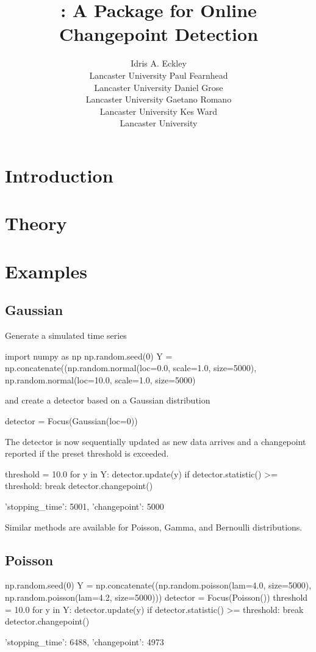 \documentclass[article]{jss}
\author{Idris A. Eckley\\Lancaster University
  \And Paul Fearnhead\\Lancaster University
  \And Daniel Grose\\Lancaster University
  \AND Gaetano Romano\\Lancaster University
  \And Kes Ward\\Lancaster University}
\title{\pkg{changepoint\_online} : A \proglang{Python} Package for Online Changepoint Detection }
\begin{document}
\section{Introduction} \label{section:introduction}



\section{Theory} \label{section:theory}



\section{Examples} \label{section:examples}
%
%
\subsection{Gaussian}
Generate a simulated time series
%
\begin{CodeChunk}
\begin{CodeInput}
import numpy as np
np.random.seed(0)
Y = np.concatenate((np.random.normal(loc=0.0, scale=1.0, size=5000),
                    np.random.normal(loc=10.0, scale=1.0, size=5000)
\end{CodeInput}
\end{CodeChunk}
%
and create a detector based on a Gaussian distribution
%
\begin{CodeChunk}
\begin{CodeInput}
detector = Focus(Gaussian(loc=0))                
\end{CodeInput}
\end{CodeChunk}
%
The detector is now sequentially updated as new data arrives and a changepoint reported if the preset threshold is exceeded.
%
\begin{CodeChunk}
\begin{CodeInput}
threshold = 10.0
for y in Y:
    detector.update(y)
    if detector.statistic() >= threshold:
        break
detector.changepoint()
\end{CodeInput}
\begin{CodeOutput}
{'stopping_time': 5001, 'changepoint': 5000}
\end{CodeOutput}
\end{CodeChunk}
%

Similar methods are available for Poisson, Gamma, and Bernoulli distributions.
%
%
\subsection{Poisson}
%
\begin{CodeChunk}
\begin{CodeInput}
np.random.seed(0)
Y = np.concatenate((np.random.poisson(lam=4.0, size=5000),
                    np.random.poisson(lam=4.2, size=5000)))
detector = Focus(Poisson())
threshold = 10.0
for y in Y:
    detector.update(y)
    if detector.statistic() >= threshold:
        break
detector.changepoint()
\end{CodeInput}
\begin{CodeOutput}
{'stopping_time': 6488, 'changepoint': 4973}
\end{CodeOutput}
\end{CodeChunk}
%
%
\end{document}
